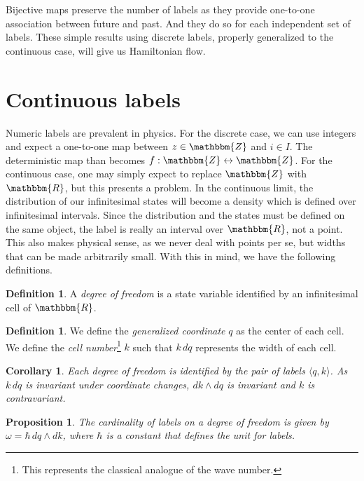 \documentclass[aps,pra,10pt,twocolumn,floatfix,nofootinbib]{revtex4-1}
\newtheorem{cor}[thm]{Corollary}
\newtheorem{prop}[thm]{Proposition}
\theoremstyle{definition}
\newtheorem{defn}[thm]{Definition}
\begin{document}
Bijective maps preserve the number of labels as they provide one-to-one association between future and past. And they do so for each independent set of labels. These simple results using discrete labels, properly generalized to the continuous case, will give us Hamiltonian flow.

\section{Continuous labels}

Numeric labels are prevalent in physics. For the discrete case, we can use integers and expect a one-to-one map between $z\in\mathbbm{Z}$ and $i\in I$. The deterministic map than becomes $f:\mathbbm{Z} \leftrightarrow \mathbbm{Z}$. For the continuous case, one may simply expect to replace $\mathbbm{Z}$ with $\mathbbm{R}$, but this presents a problem. In the continuous limit, the distribution of our infinitesimal states will become a density which is defined over infinitesimal intervals. Since the distribution and the states must be defined on the same object, the label is really an interval over $\mathbbm{R}$, not a point. This also makes physical sense, as we never deal with points per se, but widths that can be made arbitrarily small. With this in mind, we have the following definitions.

\begin{defn}\label{sdof}
A \emph{degree of freedom} is a state variable identified by an infinitesimal cell of $\mathbbm{R}$.
\end{defn}

\begin{defn}\label{sdof}
We define the \emph{generalized coordinate} $q$ as the center of each cell. We define the \emph{cell number}\footnote{This represents the classical analogue of the wave number.} $k$ such that $k \, dq$ represents the width of each cell.
\end{defn}

\begin{cor}\label{continuousLabels}
Each degree of freedom is identified by the pair of labels $\langle q,k \rangle$. As $k\,dq$ is invariant under coordinate changes, $dk\wedge dq$ is invariant and $k$ is contravariant.
\end{cor}

\begin{prop}\label{continuousLabels}
The cardinality of labels on a degree of freedom is given by $\omega = \hbar \, dq \wedge dk$, where $\hbar$ is a constant that defines the unit for labels.
\end{prop}
\end{document}

